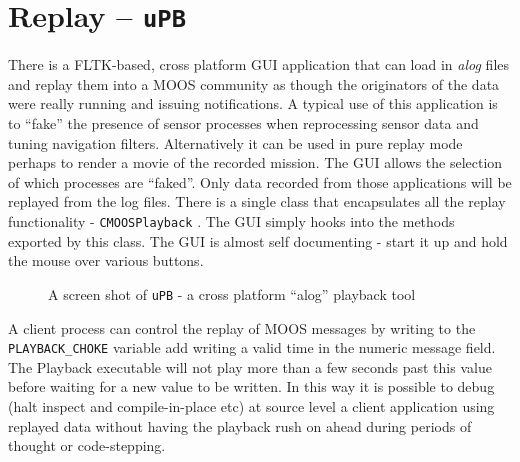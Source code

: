 \documentclass[a4paper,10pt]{article}
\newcommand{\Code}[1]{\texttt{#1} }
\newcommand{\code}[1]{\Code{#1} }
\begin{document}
\newpage

\section{Replay -- \code{uPB}}
There is a FLTK-based, cross platform GUI application that can
load in {\it{alog}} files and replay them into a MOOS community as
though the originators of the data were really running and issuing
notifications. A typical use of this application is to ``fake''
the presence of sensor processes when reprocessing sensor data and
tuning navigation filters. Alternatively it can be used in pure
replay mode perhaps to render a movie of the recorded mission. The
GUI allows the selection of which processes are ``faked''. Only
data recorded from those applications will be replayed from the
log files.  There is a single class that encapsulates all the
replay functionality - \code{CMOOSPlayback}. The GUI simply hooks
into the methods exported by this class. The GUI is almost self
documenting - start it up and hold the mouse over various buttons.

\begin{figure}
\center {} \caption{A
screen shot of \code{uPB} - a cross platform ``alog'' playback
tool}
\end{figure}

A client process can control the replay of MOOS messages by
writing to the \code{PLAYBACK\_CHOKE} variable add writing a valid
time in the numeric message field. The Playback executable will
not play more than a few seconds past this value before waiting
for a new value to be written. In this way  it is possible to
debug (halt inspect and compile-in-place etc) at source level a
client application using replayed data without having the playback
rush on ahead during periods of thought or code-stepping.
\end{document}

